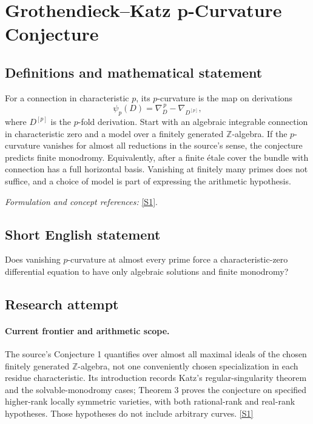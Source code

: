 \documentclass[11pt,a4paper]{article}
\newcommand{\Z}{\mathbb{Z}}
\newcommand{\sref}[2]{\hyperlink{source:#1:#2}{[S#2]}}
\newif\ifshowcatalogue
\newcommand{\cataloguescope}[1]{\ifshowcatalogue
 \paragraph{Exact scope in the supplied catalogue.}
 \begin{quote}\small #1\end{quote}\fi}
\numberwithin{equation}{section}
\begin{document}
\setcounter{section}{0}
\clearpage
\section*{\texorpdfstring{Grothendieck–Katz p-Curvature Conjecture}{Grothendieck–Katz p-Curvature Conjecture}}\label{statement}
\subsection{Definitions and mathematical statement}
For a connection in characteristic $p$, its $p$-curvature is the map on derivations
\[
 \psi_p(D)=\nabla_D^{\,p}-\nabla_{D^{[p]}},
\]
where $D^{[p]}$ is the $p$-fold derivation. Start with an algebraic integrable connection in characteristic zero and a model over a finitely generated $\Z$-algebra. If the $p$-curvature vanishes for almost all reductions in the source's sense, the conjecture predicts finite monodromy. Equivalently, after a finite étale cover the bundle with connection has a full horizontal basis. Vanishing at finitely many primes does not suffice, and a choice of model is part of expressing the arithmetic hypothesis.
\par\smallskip\textit{Formulation and concept references:} \sref{statement}{1}.
\cataloguescope{Let X be a smooth connected complex variety and (V,\ensuremath{\nabla}) an algebraic vector bundle with integrable connection, spread out over a finitely generated Z-algebra. Prove that if the reductions have zero p-curvature for almost all primes, then (V,\ensuremath{\nabla}) has a full set of algebraic solutions, equivalently becomes trivial on a finite étale cover and has finite monodromy.}
\subsection{Short English statement}
Does vanishing $p$-curvature at almost every prime force a characteristic-zero differential equation to have only algebraic solutions and finite monodromy?
\subsection{Research attempt}

\paragraph{Current frontier and arithmetic scope.}
The source's Conjecture 1 quantifies over almost all maximal ideals of the
chosen finitely generated $\Z$-algebra, not one conveniently chosen
specialization in each residue characteristic. Its introduction records
Katz's regular-singularity theorem and the solvable-monodromy cases;
Theorem 3 proves the conjecture on specified higher-rank locally symmetric
varieties, with both rational-rank and real-rank hypotheses. Those hypotheses
do not include arbitrary curves. \sref{statement}{1}
\end{document}
